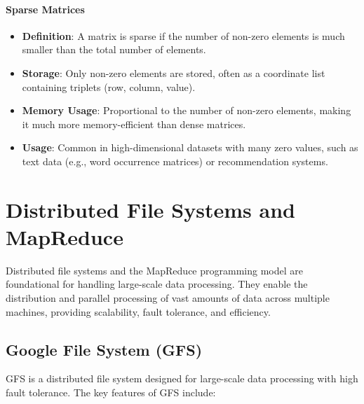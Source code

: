\documentclass[12pt]{article}
\begin{document}
\paragraph{Sparse Matrices}
\begin{itemize}
    \item \textbf{Definition}: A matrix is sparse if the number of non-zero elements is much smaller than the total number of elements.
    \item \textbf{Storage}: Only non-zero elements are stored, often as a coordinate list containing triplets (row, column, value).
    \item \textbf{Memory Usage}: Proportional to the number of non-zero elements, making it much more memory-efficient than dense matrices.
    \item \textbf{Usage}: Common in high-dimensional datasets with many zero values, such as text data (e.g., word occurrence matrices) or recommendation systems.
\end{itemize}


\section{Distributed File Systems and MapReduce}
Distributed file systems and the MapReduce programming model are foundational for handling large-scale data processing. They enable the distribution and parallel processing of vast amounts of data across multiple machines, providing scalability, fault tolerance, and efficiency.

\subsection{Google File System (GFS)}
GFS is a distributed file system designed for large-scale data processing with high fault tolerance. The key features of GFS include:
\end{document}
